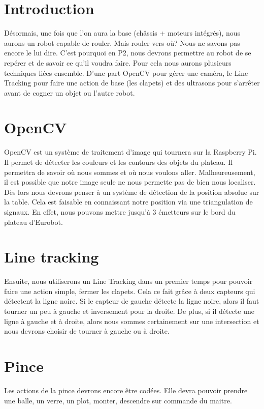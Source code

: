 \section{Introduction}
Désormais, une fois que l'on aura la base (châssis + moteurs intégrés), nous aurons un robot capable de rouler. Mais rouler vers où? Nous ne savons pas encore le lui dire. C'est pourquoi en P2, nous devrons permettre au robot de se repérer et de savoir ce qu'il voudra faire. Pour cela nous aurons plusieurs techniques liées ensemble. D'une part OpenCV pour gérer une caméra, le Line Tracking pour faire une action de base (les clapets) et des ultrasons pour s'arrêter avant de cogner un objet ou l'autre robot.

\section{OpenCV}
OpenCV est un système de traitement d'image qui tournera sur la Raspberry Pi. Il permet de détecter les couleurs et les contours des objets du plateau. Il permettra de savoir où nous sommes et où nous voulons aller. Malheureusement, il est possible que notre image seule ne nous permette pas de bien nous localiser. Dès lors nous devrons penser à un système de détection de la position absolue sur la table. Cela est faisable en connaissant notre position via une triangulation de signaux. En effet, nous pouvons mettre jusqu'à 3 émetteurs sur le bord du plateau d'Eurobot.

\section{Line tracking}
Ensuite, nous utiliserons un Line Tracking dans un premier temps pour pouvoir faire une action simple, fermer les clapets. Cela ce fait grâce à deux capteurs qui détectent la ligne noire. Si le capteur de gauche détecte la ligne noire, alors il faut tourner un peu à gauche et inversement pour la droite. De plus, si il détecte une ligne à gauche et à droite, alors nous sommes certainement sur une intersection et nous devrons choisir de tourner à gauche ou à droite.

\section{Pince}
Les actions de la pince devrons encore être codées. Elle devra pouvoir prendre une balle, un verre, un plot, monter, descendre sur commande du maitre.
